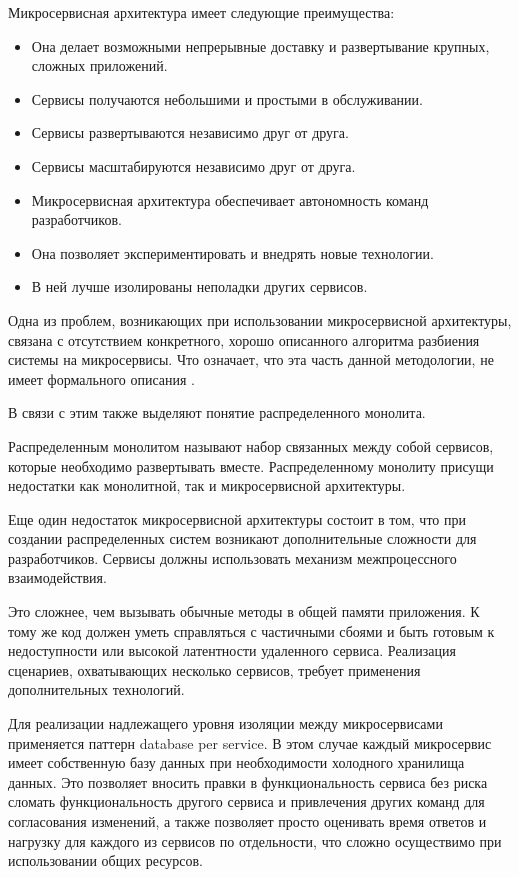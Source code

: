Микросервисная архитектура имеет следующие преимущества:
\begin{itemize}
    \item Она делает возможными непрерывные доставку и развертывание крупных, сложных приложений.
    \item Сервисы получаются небольшими и простыми в обслуживании.
    \item Сервисы развертываются независимо друг от друга.
    \item Сервисы масштабируются независимо друг от друга.
    \item Микросервисная архитектура обеспечивает автономность команд разработчиков.
    \item Она позволяет экспериментировать и внедрять новые технологии.
    \item В ней лучше изолированы неполадки других сервисов.
\end{itemize}

Одна из проблем, возникающих при использовании микросервисной архитектуры, связана с отсутствием конкретного, хорошо описанного алгоритма разбиения
системы на микросервисы. 
Что означает, что эта часть данной методологии, не имеет формального описания \cite{micro-1}. 

В связи с этим также выделяют понятие распределенного монолита.

Распределенным монолитом называют набор связанных между собой сервисов, которые необходимо развертывать вместе. Распределенному монолиту присущи недостатки
как монолитной, так и микросервисной архитектуры.

Еще один недостаток микросервисной архитектуры состоит в том, что при создании
распределенных систем возникают дополнительные сложности для разработчиков. 
Сервисы должны использовать механизм межпроцессного взаимодействия.

Это сложнее, чем вызывать обычные методы в общей памяти приложения. 
К тому же код должен уметь
справляться с частичными сбоями и быть готовым к недоступности или высокой
латентности удаленного сервиса.
Реализация сценариев, охватывающих несколько сервисов, требует применения
дополнительных технологий. 

Для реализации надлежащего уровня изоляции между микросервисами применяется паттерн database per service.
В этом случае каждый микросервис имеет собственную базу данных при необходимости холодного хранилища данных. 
Это позволяет вносить правки в функциональность сервиса без риска сломать функциональность другого сервиса и привлечения других команд для согласования изменений, 
а также позволяет просто оценивать время ответов и нагрузку для каждого из сервисов по отдельности, что сложно осуществимо при использовании общих ресурсов.

